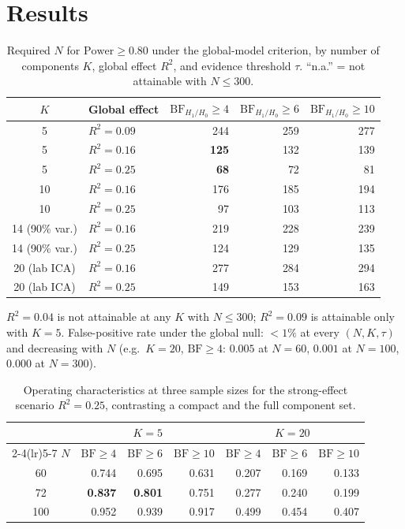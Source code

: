 \documentclass[11pt,a4paper]{article}
\newcommand{\BF}{\mathrm{BF}}
\begin{document}
\section{Results}

\begin{table}[H]
\centering\small
\caption{Required $N$ for $\mathrm{Power}\ge0.80$ under the global-model criterion, by number of components $K$, global effect $R^{2}$, and evidence threshold $\tau$. ``n.a.'' = not attainable with $N\le300$.}
\label{tab:v4}
\begin{tabular}{clrrr}
\toprule
$K$ & Global effect & $\BF_{H_1/H_0}\ge4$ & $\BF_{H_1/H_0}\ge6$ & $\BF_{H_1/H_0}\ge10$\\
\midrule
\rowcolor{RowGrey}
5 & $R^2=0.09$ & 244 & 259 & 277\\
\rowcolor{RowGrey}
5 & $R^2=0.16$ & \textbf{125} & 132 & 139\\
\rowcolor{RowGrey}
5 & $R^2=0.25$ & \textbf{68} & 72 & 81\\
10 & $R^2=0.16$ & 176 & 185 & 194\\
10 & $R^2=0.25$ & 97 & 103 & 113\\
14 (90\% var.) & $R^2=0.16$ & 219 & 228 & 239\\
14 (90\% var.) & $R^2=0.25$ & 124 & 129 & 135\\
20 (lab ICA) & $R^2=0.16$ & 277 & 284 & 294\\
20 (lab ICA) & $R^2=0.25$ & 149 & 153 & 163\\
\bottomrule
\end{tabular}

\vspace{2pt}
{\footnotesize $R^{2}=0.04$ is not attainable at any $K$ with $N\le300$; $R^{2}=0.09$ is attainable only with $K=5$. False-positive rate under the global null: $<1\%$ at every $(N,K,\tau)$ and decreasing with $N$ (e.g.\ $K=20$, $\BF\ge4$: $0.005$ at $N=60$, $0.001$ at $N=100$, $0.000$ at $N=300$).}
\end{table}

\begin{table}[H]
\centering\small
\caption{Operating characteristics at three sample sizes for the strong-effect scenario $R^{2}=0.25$, contrasting a compact and the full component set.}
\label{tab:v4op}
\begin{tabular}{crrrrrr}
\toprule
 & \multicolumn{3}{c}{$K=5$} & \multicolumn{3}{c}{$K=20$}\\
\cmidrule(lr){2-4}\cmidrule(lr){5-7}
$N$ & $\BF\ge4$ & $\BF\ge6$ & $\BF\ge10$ & $\BF\ge4$ & $\BF\ge6$ & $\BF\ge10$\\
\midrule
60 & 0.744 & 0.695 & 0.631 & 0.207 & 0.169 & 0.133\\
72 & \textbf{0.837} & \textbf{0.801} & 0.751 & 0.277 & 0.240 & 0.199\\
100 & 0.952 & 0.939 & 0.917 & 0.499 & 0.454 & 0.407\\
\bottomrule
\end{tabular}
\end{table}
\end{document}

